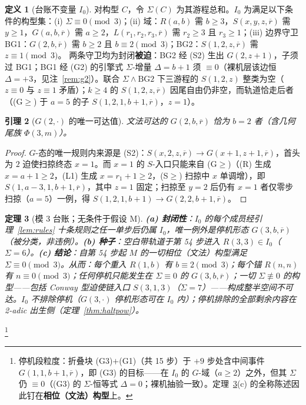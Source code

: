 \documentclass[11pt]{ctexart}
\newtheorem{theorem}{定理}[section]
\newtheorem{lemma}[theorem]{引理}
\theoremstyle{definition}
\newtheorem{definition}[theorem]{定义}
\begin{document}
\begin{definition}[台账不变量 $I_0$]\label{def:I0}
对构型 $C$，令 $\Sigma(C)$ 为其游程总和。$I_0$ 为满足以下条件的构型集：(i) $\Sigma\equiv0\pmod3$；(ii) 域：$R(a,b)$ 需 $b\ge3$，$S(x,y,z,\overline r)$ 需 $y\ge1$，$G(a,b,\overline r)$ 需 $a\ge2$，$L(r_1,r_2,r_3,\overline r)$ 需 $r_2\ge3$ 且 $r_3\ge1$；(iii) 边界守卫 BG1：$G(2,b,\overline r)$ 需 $b\ge2$ 且 $b\equiv2\pmod3$；BG2：$S(1,2,z,\overline r)$ 需 $z\equiv1\pmod3$。
两条守卫均为封闭\textbf{被迫}：BG2 经 (S2) 生出 $G(2,z{+}1)$，子须过 BG1；BG1 经 (G2) 的引擎式 $\Sigma$-增量 $\Delta=b{+}1$ 须 $\equiv0$（裸机层该边恒 $\Delta=+3$，见注~\ref{rem:g2}）。联合 $\Sigma\wedge\mathrm{BG2}$ 下三游程的 $S(1,2,z)$ 整类为空（$z\equiv0$ 与 $z\equiv1$ 矛盾）；$k\ge4$ 的 $S(1,2,z,\overline r)$ 因尾自由仍非空，而轨道恰走后者（(G$\ge$) 于 $a=5$ 的子 $S(1,2,1,b{+}1,\overline r)$，$z=1$）。
\end{definition}

\begin{lemma}[$G(2,\cdot)$ 的唯一可达值]\label{lem:g22}
文法可达的 $G(2,b,\overline r)$ 恰为 $b=2$ 者（含几何尾族 $\Phi(3,m)$）。
\end{lemma}
\begin{proof}
$G$-态的唯一规则内来源是 (S2)：$S(x,2,z,\overline r)\to G(x{+}1,z{+}1,\overline r)$，首头为 $2$ 迫使扫掠终态 $x=1$。而 $x=1$ 的 $S$-入口只能来自 (G$\ge$)（(R) 生成 $x=a{+}1\ge2$，(L1) 生成 $x=r_1{+}1\ge2$，(S$\ge$) 扫掠中 $x$ 单调增），即 $S(1,a{-}3,1,b{+}1,\overline r)$，其中 $z=1$ 固定；扫掠至 $y=2$ 后仍有 $x=1$ 者仅零步扫掠（$a=5$）一例，得 $S(1,2,1,b{+}1)\to G(2,2,b{+}1,\overline r)$。
\end{proof}

\begin{theorem}[模 3 台账；无条件于假设 M]\label{thm:mod3}
\textbf{(a) 封闭性}：$I_0$ 的每个成员经引理~\ref{lem:rules} 十条规则之任一单步后仍属 $I_0$，唯一例外是停机形态 $G(3,b,\overline r)$（被分类，非违例）。\textbf{(b) 种子}：空白带轨道于第 54 步进入 $R(3,3)\in I_0$（$\Sigma=6$）。\textbf{(c) 结论}：自第 54 步起 $M$ 的一切相位（文法）构型满足 $\Sigma\equiv0\pmod3$。从而：每个重入 $R(1,b)$ 有 $b\equiv2\pmod3$；每个锚 $R(n,n)$ 有 $n\equiv0\pmod3$；任何停机只能发生在 $\Sigma\equiv0$ 的 $G(3,b,\overline r)$；一切 $\Sigma\not\equiv0$ 的构型——包括 Conway 型迫使链入口 $S(3,1,3)$（$\Sigma=7$）——构成整半空间不可达。$I_0$ 不排除停机（$G(3,\cdot)$ 停机形态可在 $I_0$ 内）；停机排除的全部剩余内容在 2-adic 出生侧（定理~\ref{thm:haltpow}）。
\end{theorem}
\footnote{停机段粒度：折叠块 (G3)$+$(G1)（共 15 步）于 $+9$ 步处含中间事件 $G(1,1,b{+}1,\overline r)$，即 (G3) 的目标——在 $I_0$ 的 $G$-域（$a\ge2$）之外，但其 $\Sigma$ 仍 $\equiv0$（(G3) 的 $\Sigma$-恒等式 $\Delta=0$；裸机抽验一致）。定理~\ref{thm:mod3}(c) 的全称陈述因此钉在\textbf{相位（文法）构型}上。}
\end{document}
